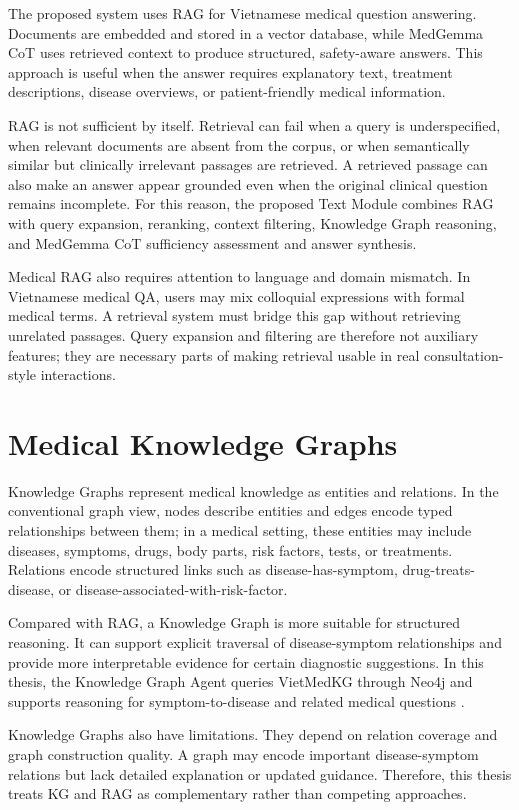 The proposed system uses RAG for Vietnamese medical question answering. Documents are embedded and stored in a vector database, while MedGemma CoT uses retrieved context to produce structured, safety-aware answers. This approach is useful when the answer requires explanatory text, treatment descriptions, disease overviews, or patient-friendly medical information.

RAG is not sufficient by itself. Retrieval can fail when a query is underspecified, when relevant documents are absent from the corpus, or when semantically similar but clinically irrelevant passages are retrieved. A retrieved passage can also make an answer appear grounded even when the original clinical question remains incomplete. For this reason, the proposed Text Module combines RAG with query expansion, reranking, context filtering, Knowledge Graph reasoning, and MedGemma CoT sufficiency assessment and answer synthesis.

Medical RAG also requires attention to language and domain mismatch. In Vietnamese medical QA, users may mix colloquial expressions with formal medical terms. A retrieval system must bridge this gap without retrieving unrelated passages. Query expansion and filtering are therefore not auxiliary features; they are necessary parts of making retrieval usable in real consultation-style interactions.

\section{Medical Knowledge Graphs}

Knowledge Graphs represent medical knowledge as entities and relations. In the conventional graph view, nodes describe entities and edges encode typed relationships between them; in a medical setting, these entities may include diseases, symptoms, drugs, body parts, risk factors, tests, or treatments. Relations encode structured links such as disease-has-symptom, drug-treats-disease, or disease-associated-with-risk-factor.

Compared with RAG, a Knowledge Graph is more suitable for structured reasoning. It can support explicit traversal of disease-symptom relationships and provide more interpretable evidence for certain diagnostic suggestions. In this thesis, the Knowledge Graph Agent queries VietMedKG through Neo4j and supports reasoning for symptom-to-disease and related medical questions \cite{neo4j_cypher_doc}.

Knowledge Graphs also have limitations. They depend on relation coverage and graph construction quality. A graph may encode important disease-symptom relations but lack detailed explanation or updated guidance. Therefore, this thesis treats KG and RAG as complementary rather than competing approaches.

